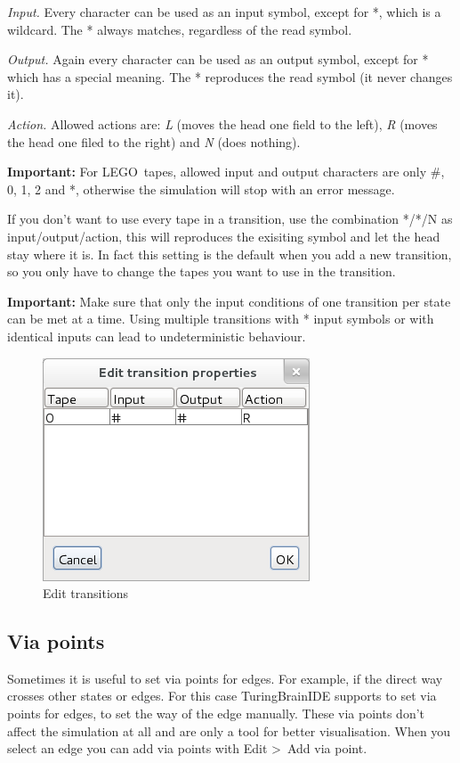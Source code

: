\documentclass[%
  a4paper,%
  11pt,%
  blue,%
  hyperref	%
  ]{tubsartcl}
\begin{document}
\emph{Input.} Every character can be used as an input symbol, except for *, which is a wildcard. The * always matches, regardless of the read symbol.

\emph{Output.} Again every character can be used as an output symbol, except for * which has a special meaning. The * reproduces the read symbol (it never changes it).

\emph{Action.} Allowed actions are: \emph{L} (moves the head one field to the left), \emph{R} (moves the head one filed to the right) and \emph{N} (does nothing).
\bigskip

\textbf{Important:}  For LEGO\textregistered\, tapes, allowed input and output characters are only \#, 0, 1, 2 and *, otherwise the simulation will stop with an error message.

If you don't want to use every tape in a transition, use the combination */*/N as input/output/action, this will reproduces the exisiting symbol and let the head stay where it is. In fact this setting is the default when you add a new transition, so you only have to change the tapes you want to use in the transition.

\textbf{Important:} Make sure that only the input conditions of one transition per state can be met at a time. Using multiple transitions with * input symbols or with identical inputs can lead to undeterministic behaviour.


\begin{figure}[!htb]
\begin{center}
\includegraphics[scale=0.5]{graphics_gui/edit_transitions.png}
\end{center}
\caption{Edit transitions}
\label{pic:edit_transitions}
\end{figure}

\clearpage

\subsection{Via points}
\label{sec:via-points}
Sometimes it is useful to set via points for edges. For example, if the direct way crosses other states or edges. For this case TuringBrainIDE supports to set via points for edges, to set the way of the edge manually. These via points don't affect the simulation at all and are only a tool for better visualisation. When you select an edge you can add via points with Edit \textgreater \ Add via point.
\end{document}
